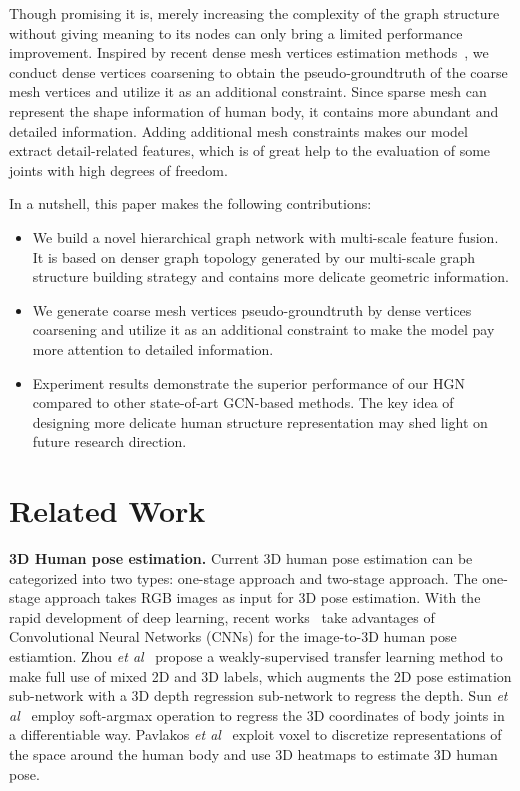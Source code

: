 \documentclass{bmvc2k}
\def\etal{\emph{et al}\bmvaOneDot}
\begin{document}
Though promising it is, merely increasing the complexity of the graph structure without giving meaning to its nodes can only bring a limited performance improvement. Inspired by recent dense mesh vertices estimation methods~\cite{choi2020pose2mesh}, we conduct dense vertices coarsening to obtain the pseudo-groundtruth of the coarse mesh vertices and utilize it as an additional constraint. Since sparse mesh can represent the shape information of human body, it contains more abundant and detailed information. Adding additional mesh constraints makes our model extract detail-related features, which is of great help to the evaluation of some joints with high degrees of freedom. 



In a nutshell, this paper makes the following contributions:
\begin{itemize}
\item We build a novel hierarchical graph network with multi-scale feature fusion. It is based on denser graph topology generated by our multi-scale graph structure building strategy and contains more delicate geometric information.  
\item We generate coarse mesh vertices pseudo-groundtruth by dense vertices coarsening and utilize it as an additional constraint to make the model pay more attention to detailed information.
\item Experiment results demonstrate the superior performance of our HGN compared to other state-of-art GCN-based methods. The key idea of designing more delicate human structure representation may shed light on future research direction.
\end{itemize}

\section{Related Work}
\textbf{3D Human pose estimation.} Current 3D human pose estimation can be categorized into two types: one-stage approach and two-stage approach. The one-stage approach takes  RGB images as input for 3D pose estimation.  With the rapid development of deep learning, 
recent works~\cite{zhou2017towards,shi2020tiny,2018Ordinal,moon2019camera,lin2020hdnet,sun2017compositional} take advantages of Convolutional Neural Networks (CNNs)  for the image-to-3D human pose estiamtion.
Zhou \etal~\cite{zhou2017towards} propose  a weakly-supervised transfer learning method to make full use of mixed 2D and 3D labels, which augments the 2D pose estimation sub-network with a 3D depth regression sub-network to regress the depth. Sun \etal~\cite{sun2018integral} employ soft-argmax operation to regress the 3D coordinates of body joints in a differentiable way. Pavlakos \etal~\cite{2018Ordinal} exploit voxel to discretize representations of the space around the human body and use 3D heatmaps to estimate 3D human pose.
\end{document}
